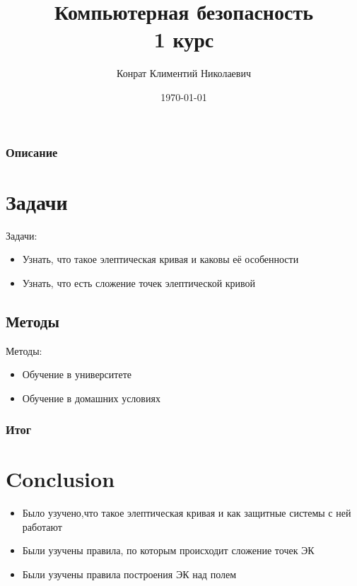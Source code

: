 \documentclass{beamer}
\title{Компьютерная безопасность \\1 курс}
\author{Конрат Климентий Николаевич}
\institute{Балтийский федеральный университет им. Иммануила Канта}
\date{\today}
\begin{document}
\begin{frame}
\titlepage
\end{frame}

\begin{frame}
\frametitle{Описание}
\section{Задачи} 
Задачи:

\begin{itemize}
\item Узнать, что такое элептическая кривая и каковы её особенности
\item Узнать, что есть сложение точек элептической кривой
\end{itemize}

\subsection{Методы}
Методы:

\begin{itemize}
\item Обучение в университете
\item Обучение в домашних условиях
\end{itemize}

\end{frame}

\begin{frame}
\frametitle{Итог}
\section{Conclusion}
\begin{itemize}
\item Было узучено,что такое элептическая кривая и как защитные системы с ней работают
\item Были узучены правила, по которым происходит сложение точек ЭК
\item Были узучены правила построения ЭК над полем
\end{itemize}
\end{frame}
\end{document}
